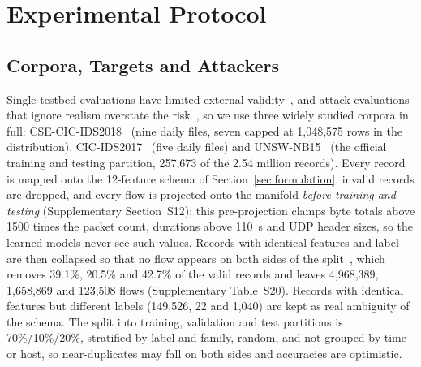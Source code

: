 \section{Experimental Protocol}
\label{sec:experiments}
\label{sec:empirical_evaluation}

\subsection{Corpora, Targets and Attackers}
\label{sec:setup}

Single-testbed evaluations have limited external validity~\cite{cantone2024crossdataset}, and attack evaluations that ignore realism overstate the risk~\cite{apruzzese2022modeling, apruzzese2023real}, so we use three widely studied corpora in full: CSE-CIC-IDS2018~\cite{sharafaldin2018toward} (nine daily files, seven capped at 1,048,575 rows in the distribution), CIC-IDS2017~\cite{sharafaldin2018toward} (five daily files) and UNSW-NB15~\cite{moustafa2015unsw} (the official training and testing partition, 257,673 of the 2.54 million records). Every record is mapped onto the 12-feature schema of Section~\ref{sec:formulation}, invalid records are dropped, and every flow is projected onto the manifold \emph{before training and testing} (Supplementary Section~S12); this pre-projection clamps byte totals above 1500 times the packet count, durations above 110~s and UDP header sizes, so the learned models never see such values. Records with identical features and label are then collapsed so that no flow appears on both sides of the split~\cite{engelen2021troubleshooting, lanvin2023errors}, which removes 39.1\%, 20.5\% and 42.7\% of the valid records and leaves 4,968,389, 1,658,869 and 123,508 flows (Supplementary Table~S20). Records with identical features but different labels (149,526, 22 and 1,040) are kept as real ambiguity of the schema. The split into training, validation and test partitions is 70\%/10\%/20\%, stratified by label and family, random, and not grouped by time or host, so near-duplicates may fall on both sides and accuracies are optimistic.

